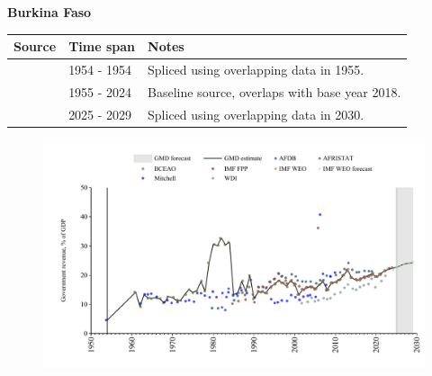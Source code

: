 \documentclass[12pt,a4paper,landscape]{article}
\begin{document}
\begin{adjustbox}{max totalsize={\paperwidth}{\paperheight},center}
\begin{minipage}[t][\textheight][t]{\textwidth}
\vspace*{0.5cm}
{}
\begin{center}
{\Large\bfseries Burkina Faso}
\end{center}
\vspace{0.5cm}
\begin{table}[H]
\centering
\small
\begin{tabular}{|l|l|l|}
\hline
\textbf{Source} & \textbf{Time span} & \textbf{Notes} \\
\hline
\rowcolor{white}\cite{Mitchell}& 1954 - 1954 &Spliced using overlapping data in 1955.\\
\rowcolor{lightgray}\cite{BCEAO}& 1955 - 2024 &Baseline source, overlaps with base year 2018.\\
\rowcolor{white}\cite{IMF_WEO_forecast}& 2025 - 2029 &Spliced using overlapping data in 2030.\\
\hline
\end{tabular}
\end{table}
\begin{figure}[H]
\centering
\includegraphics[width=\textwidth,height=0.6\textheight,keepaspectratio]{graphs/BFA_govrev_GDP.pdf}
\end{figure}
\end{minipage}
\end{adjustbox}
\end{document}
